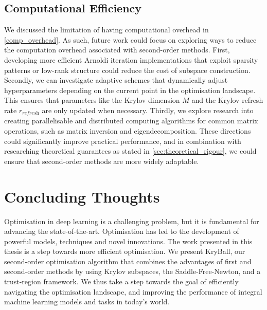 \subsection{Computational Efficiency}
\label{ssec:computational_efficiency}
We discussed the limitation of having computational overhead in \cref{comp_overhead}. As such, future work could focus on exploring ways to reduce the computation overhead associated with second-order methods. First, developing more efficient Arnoldi iteration implementations that exploit sparsity patterns or low-rank structure could reduce the cost of subspace construction. Secondly, we can investigate adaptive schemes that dynamically adjust hyperparameters depending on the current point in the optimisation landscape. This ensures that parameters like the Krylov dimension $M$ and the Krylov refresh rate $r_\textit{refresh}$ are only updated when necessary. Thirdly, we explore research into creating parallelisable and distributed computing algorithms for common matrix operations, such as matrix inversion and eigendecomposition. These directions could significantly improve practical performance, and in combination with researching theoretical guarantees as stated in \cref{sec:theoretical_rigour}, we could ensure that second-order methods are more widely adaptable.

\section{Concluding Thoughts}
\label{sec:concluding_thoughts}

Optimisation in deep learning is a challenging problem, but it is fundamental for advancing the state-of-the-art. Optimisation has led to the development of powerful models, techniques and novel innovations. The work presented in this thesis is a step towards more efficient optimisation. We present KryBall, our second-order optimisation algorithm that combines the advantages of first and second-order methods by using Krylov subspaces, the Saddle-Free-Newton, and a trust-region framework. We thus take a step towards the goal of efficiently navigating the optimisation landscape, and improving the performance of integral machine learning models and tasks in today's world.